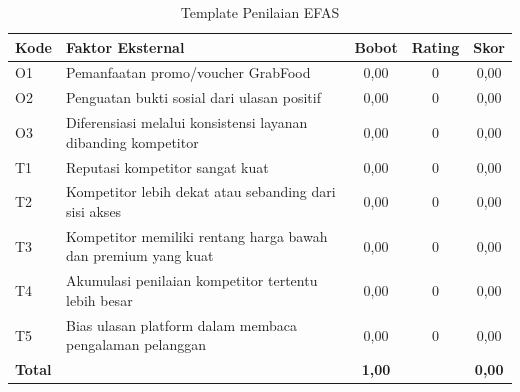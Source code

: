 \begin{table}[!htbp]
    \centering
    \caption{Template Penilaian EFAS}
    \label{tab:template-penilaian-efas}
    \footnotesize
    \setlength{\tabcolsep}{4pt}
    \renewcommand{\arraystretch}{0.95}
    \begin{tabularx}{\textwidth}{|Z{1.2cm}|Y|c|c|c|}
        \toprule
        \textbf{Kode} & \textbf{Faktor Eksternal} & \textbf{Bobot} & \textbf{Rating} & \textbf{Skor} \\ \hline
        \midrule
        O1 & Pemanfaatan promo/voucher GrabFood & 0,00 & 0 & 0,00 \\ \hline
        O2 & Penguatan bukti sosial dari ulasan positif & 0,00 & 0 & 0,00 \\ \hline
        O3 & Diferensiasi melalui konsistensi layanan dibanding kompetitor & 0,00 & 0 & 0,00 \\ \hline
        T1 & Reputasi kompetitor sangat kuat & 0,00 & 0 & 0,00 \\ \hline
        T2 & Kompetitor lebih dekat atau sebanding dari sisi akses & 0,00 & 0 & 0,00 \\ \hline
        T3 & Kompetitor memiliki rentang harga bawah dan premium yang kuat & 0,00 & 0 & 0,00 \\ \hline
        T4 & Akumulasi penilaian kompetitor tertentu lebih besar & 0,00 & 0 & 0,00 \\ \hline
        T5 & Bias ulasan platform dalam membaca pengalaman pelanggan & 0,00 & 0 & 0,00 \\ \hline
        \textbf{Total} &  & \textbf{1,00} &  & \textbf{0,00} \\ \hline
        \bottomrule
    \end{tabularx}
\end{table}

